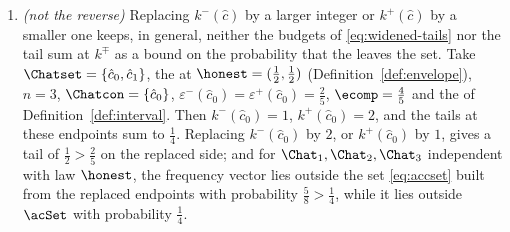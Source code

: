 \begin{lemma}
\begin{enumerate}[label=(\roman*),leftmargin=2.2em]
\begin{equation}
  \Pr\big[\Ncount{\hat c}^{-}<\tilde k^{-}(\hat c)\big]
  \le\Pr\big[\Ncount{\hat c}^{-}<k^{-}(\hat c)\big]
  \le\varepsilon^{-}(\hat c),
  \qquad
  \Pr\big[\Ncount{\hat c}^{+}>\tilde k^{+}(\hat c)\big]
  \le\Pr\big[\Ncount{\hat c}^{+}>k^{+}(\hat c)\big]
  \le\varepsilon^{+}(\hat c).
\end{equation}
Summed over $\Chatcon$, the tails at $\tilde k^{\mp}$ therefore total at most
the tails at $k^{\mp}$, and at most $\ecomp$.
\item \emph{(not the reverse)} Replacing $k^{-}(\hat c)$ by a larger integer
or $k^{+}(\hat c)$ by a smaller one keeps, in general, neither the budgets of
\eqref{eq:widened-tails} nor the tail sum at $k^{\mp}$ as a bound on the
probability that the  leaves the set. Take
$\Chatset=\{\hat c_0,\hat c_1\}$, the  at
$\honest=(\tfrac12,\tfrac12)$ (Definition~\ref{def:envelope}), $n=3$,
$\Chatcon=\{\hat c_0\}$,
$\varepsilon^{-}(\hat c_0)=\varepsilon^{+}(\hat c_0)=\tfrac25$,
$\ecomp=\tfrac45$ and the  of
Definition~\ref{def:interval}. Then $k^{-}(\hat c_0)=1$, $k^{+}(\hat c_0)=2$,
and the tails at these endpoints sum to $\tfrac14$. Replacing
$k^{-}(\hat c_0)$ by $2$, or $k^{+}(\hat c_0)$ by $1$, gives a tail of
$\tfrac12>\tfrac25$ on the replaced side; and for $\Chat_1,\Chat_2,\Chat_3$
independent with law $\honest$, the frequency vector lies outside the set
\eqref{eq:accset} built from the replaced endpoints with probability
$\tfrac58>\tfrac14$, while it lies outside $\acSet$ with probability
$\tfrac14$.
\end{enumerate}
\end{lemma}


